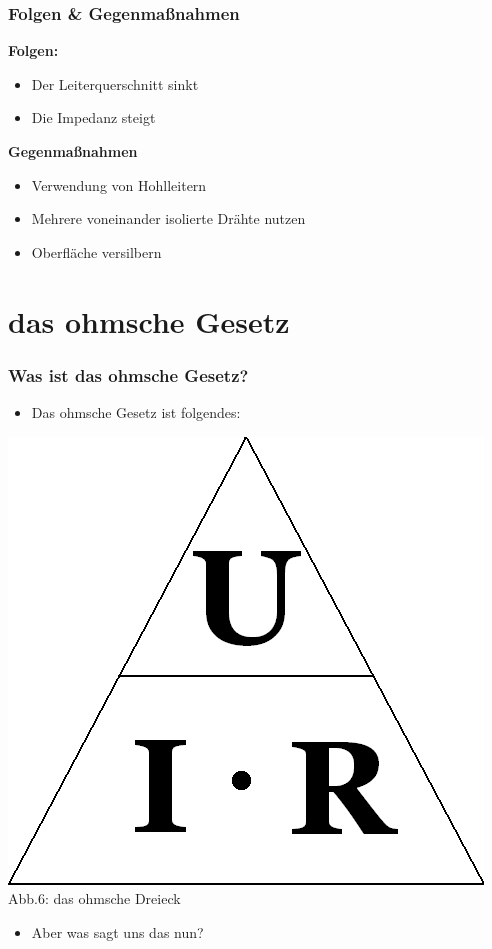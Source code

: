 \begin{frame}
	\frametitle{Folgen \& Gegenmaßnahmen}
	\textbf{Folgen:}	
	\begin{itemize}
		\item Der Leiterquerschnitt sinkt
		\item Die Impedanz steigt
	\end{itemize}
	\textbf{Gegenmaßnahmen}
	\begin{itemize}
		\item Verwendung von Hohlleitern
		\item Mehrere voneinander isolierte Drähte nutzen
		\item Oberfläche versilbern
	\end{itemize}
\end{frame}


\section{das ohmsche Gesetz}

\begin{frame}
    \frametitle{Was ist das ohmsche Gesetz?}
    \begin{itemize}
    	\item Das ohmsche Gesetz ist folgendes:
    \end{itemize}
    \begin{center}
 		\includegraphics[scale=0.3]{e03/Ohm_law_triangle.png}\\
 		\small{Abb.6: das ohmsche Dreieck \cite{wmen}}
 	\end{center}
 	\begin{itemize}
 		\item	Aber was sagt uns das nun?
 	\end{itemize}
\end{frame}

